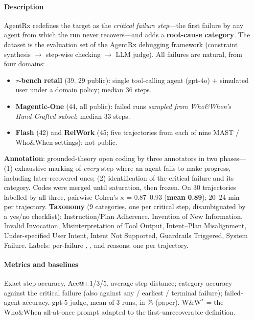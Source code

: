 \paragraph{Description} AgentRx redefines the target as the \emph{critical failure step}---the first failure by any agent from which the run never recovers---and adds a \textbf{root-cause category}. The dataset is the evaluation set of the AgentRx debugging framework (constraint synthesis $\to$ step-wise checking $\to$ LLM judge). All failures are natural, from four domains:
\begin{itemize}
\item \textbf{$\tau$-bench retail} (39, 29 public): single tool-calling agent (gpt-4o) + simulated user under a domain policy; median 36 steps.
\item \textbf{Magentic-One} (44, all public): failed runs \emph{sampled from Who\&When's Hand-Crafted subset}; median 33 steps.
\item \textbf{Flash} (42) and \textbf{RelWork} (45; five trajectories from each of nine MAST / Who\&When settings): not public.
\end{itemize}
\textbf{Annotation}: grounded-theory open coding by three annotators in two phases---(1) exhaustive marking of \emph{every} step where an agent fails to make progress, including later-recovered ones; (2) identification of the critical failure and its category. Codes were merged until saturation, then frozen. On 30 trajectories labelled by all three, pairwise Cohen's $\kappa$ = 0.87--0.93 (\textbf{mean 0.89}); 20--24 min per trajectory. \textbf{Taxonomy} (9 categories, one per critical step, disambiguated by a yes/no checklist): Instruction/Plan Adherence, Invention of New Information, Invalid Invocation, Misinterpretation of Tool Output, Intent--Plan Misalignment, Under-specified User Intent, Intent Not Supported, Guardrails Triggered, System Failure. Labels: per-failure , ,  and reasons; one  per trajectory.

\paragraph{Metrics and baselines} Exact step accuracy, Acc@$\pm$1/3/5, average step distance; category accuracy against the critical failure (also against any / earliest / terminal failure); failed-agent accuracy. gpt-5 judge, mean of 3 runs, in \% (paper). W\&W$^*$ = the Who\&When all-at-once prompt adapted to the first-unrecoverable definition.

